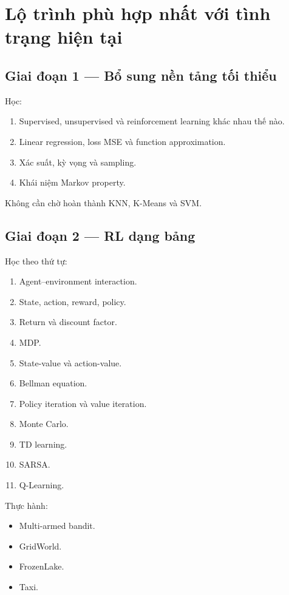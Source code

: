 \documentclass[12pt,a4paper]{article}
\begin{document}
\section{Lộ trình phù hợp nhất với tình trạng hiện tại}

\subsection{Giai đoạn 1 --- Bổ sung nền tảng tối thiểu}

Học:

\begin{enumerate}[leftmargin=1.8em]
    \item Supervised, unsupervised và reinforcement learning khác nhau thế nào.
    \item Linear regression, loss MSE và function approximation.
    \item Xác suất, kỳ vọng và sampling.
    \item Khái niệm Markov property.
\end{enumerate}

Không cần chờ hoàn thành KNN, K-Means và SVM.

\subsection{Giai đoạn 2 --- RL dạng bảng}

Học theo thứ tự:

\begin{enumerate}[leftmargin=1.8em]
    \item Agent--environment interaction.
    \item State, action, reward, policy.
    \item Return và discount factor.
    \item MDP.
    \item State-value và action-value.
    \item Bellman equation.
    \item Policy iteration và value iteration.
    \item Monte Carlo.
    \item TD learning.
    \item SARSA.
    \item Q-Learning.
\end{enumerate}

Thực hành:

\begin{itemize}[leftmargin=1.5em]
    \item Multi-armed bandit.
    \item GridWorld.
    \item FrozenLake.
    \item Taxi.
\end{itemize}
\end{document}
